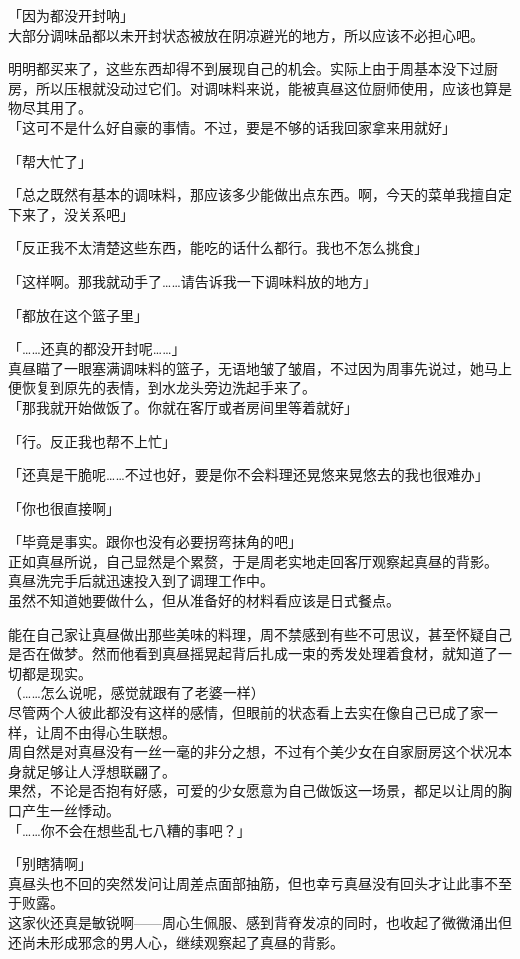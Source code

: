「因为都没开封呐」\\

大部分调味品都以未开封状态被放在阴凉避光的地方，所以应该不必担心吧。

明明都买来了，这些东西却得不到展现自己的机会。实际上由于周基本没下过厨房，所以压根就没动过它们。对调味料来说，能被真昼这位厨师使用，应该也算是物尽其用了。\\

「这可不是什么好自豪的事情。不过，要是不够的话我回家拿来用就好」

「帮大忙了」

「总之既然有基本的调味料，那应该多少能做出点东西。啊，今天的菜单我擅自定下来了，没关系吧」

「反正我不太清楚这些东西，能吃的话什么都行。我也不怎么挑食」

「这样啊。那我就动手了……请告诉我一下调味料放的地方」

「都放在这个篮子里」

「……还真的都没开封呢……」\\

真昼瞄了一眼塞满调味料的篮子，无语地皱了皱眉，不过因为周事先说过，她马上便恢复到原先的表情，到水龙头旁边洗起手来了。\\

「那我就开始做饭了。你就在客厅或者房间里等着就好」

「行。反正我也帮不上忙」

「还真是干脆呢……不过也好，要是你不会料理还晃悠来晃悠去的我也很难办」

「你也很直接啊」

「毕竟是事实。跟你也没有必要拐弯抹角的吧」\\

正如真昼所说，自己显然是个累赘，于是周老实地走回客厅观察起真昼的背影。\\

真昼洗完手后就迅速投入到了调理工作中。\\

虽然不知道她要做什么，但从准备好的材料看应该是日式餐点。

能在自己家让真昼做出那些美味的料理，周不禁感到有些不可思议，甚至怀疑自己是否在做梦。然而他看到真昼摇晃起背后扎成一束的秀发处理着食材，就知道了一切都是现实。\\

（……怎么说呢，感觉就跟有了老婆一样）\\

尽管两个人彼此都没有这样的感情，但眼前的状态看上去实在像自己已成了家一样，让周不由得心生联想。\\

周自然是对真昼没有一丝一毫的非分之想，不过有个美少女在自家厨房这个状况本身就足够让人浮想联翩了。\\

果然，不论是否抱有好感，可爱的少女愿意为自己做饭这一场景，都足以让周的胸口产生一丝悸动。\\

「……你不会在想些乱七八糟的事吧？」

「别瞎猜啊」\\

真昼头也不回的突然发问让周差点面部抽筋，但也幸亏真昼没有回头才让此事不至于败露。\\

这家伙还真是敏锐啊——周心生佩服、感到背脊发凉的同时，也收起了微微涌出但还尚未形成邪念的男人心，继续观察起了真昼的背影。
